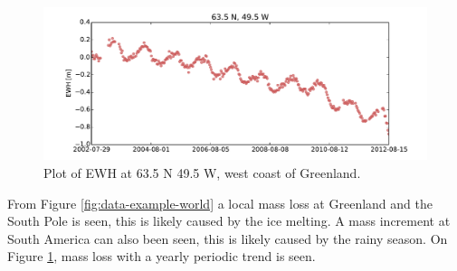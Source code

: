 \begin{figure}[H]
	\centering
	\includegraphics[width=\textwidth]{figures/data-example-scatter}
	\caption{Plot of EWH at 63.5 N 49.5 W, west coast of Greenland.}
	\label{fig:data-example-scatter}
\end{figure}

From Figure \ref{fig:data-example-world} a local mass loss at Greenland and the South Pole is seen, this is likely caused by the ice melting.
A mass increment at South America can also been seen, this is likely caused by the rainy season.
On Figure \ref{fig:data-example-scatter}, mass loss with a yearly periodic trend is seen.
